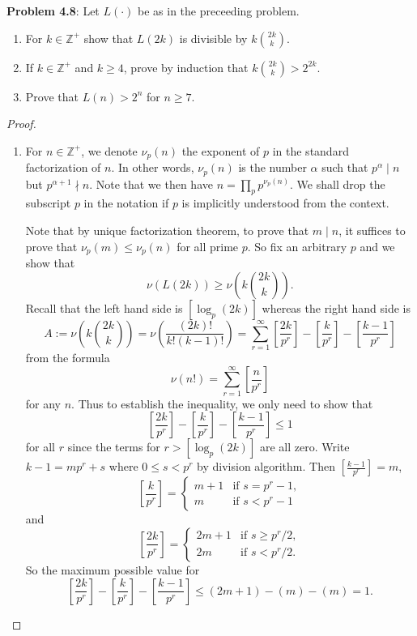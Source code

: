 \documentclass[12pt]{article}
\newcommand{\Z}{\mathbb{Z}}
\newcommand{\IntPart}[1]{\left[ #1 \right]}
\newcommand{\val}[1]{\nu\left( #1 \right)}
\newcommand{\pval}[1]{\nu_p\left( #1 \right)}
\begin{document}
\fi

\textbf{Problem 4.8}: Let $L(\cdot)$ be as in the preceeding problem.
\begin{enumerate}
\item For $k \in \Z^+$ show that $L(2k)$ is divisible by $k \binom{2k}{k}$.
\item If $k \in \Z^+$ and $k \geq 4$, prove by induction that $k \binom{2k}{k} > 2^{2k}$.
\item Prove that $L(n) > 2^n$ for $n \geq 7$.
\end{enumerate}

\begin{proof}
\begin{enumerate}
\item For $n \in \Z^+$, we denote $\pval{n}$ the exponent of $p$ in the standard factorization of $n$. In other words, $\pval{n}$ is the number $\alpha$ such that $p^\alpha \;|\; n$ but $p^{\alpha+1} \nmid n$. Note that we then have $n = \prod_p p^{\pval{n}}$. We shall drop the subscript $p$ in the notation if $p$ is implicitly understood from the context.

Note that by unique factorization theorem, to prove that $m \;|\; n$, it suffices to prove that $\pval{m} \leq \pval{n}$ for all prime $p$. So fix an arbitrary $p$ and we show that
$$\val{L(2k)} \geq \val{k\binom{2k}{k}}.$$
Recall that the left hand side is $[\log_p (2k)]$ whereas the right hand side is
$$A := \val{k\binom{2k}{k}} = \val{\frac{(2k)!}{k!(k-1)!}} = \sum_{r = 1}^{\infty} \IntPart{ \frac{2k}{p^r} } - \IntPart{ \frac{k}{p^r} } - \IntPart{ \frac{k-1}{p^r} }$$
from the formula
$$\val{n!} = \sum_{r = 1}^{\infty} \IntPart{ \frac{n}{p^r} }$$
for any $n$. Thus to establish the inequality, we only need to show that
$$\IntPart{ \frac{2k}{p^r} } - \IntPart{ \frac{k}{p^r} } - \IntPart{ \frac{k-1}{p^r} } \leq 1$$
for all $r$ since the terms for $r > [\log_p(2k)]$ are all zero. Write $k - 1 = m p^r + s$ where $0 \leq s < p^r$ by division algorithm. Then $\IntPart{ \frac{k-1}{p^r} } = m$,
$$\IntPart{ \frac{k}{p^r} } = \begin{cases}
m + 1 &\text{if } s = p^r - 1,\\
m &\text{if } s < p^r - 1
\end{cases}$$
and
$$\IntPart{ \frac{2k}{p^r} } = \begin{cases}
2m + 1 &\text{if } s \geq p^r / 2,\\
2m &\text{if } s < p^r / 2.
\end{cases}$$
So the maximum possible value for
$$\IntPart{ \frac{2k}{p^r} } - \IntPart{ \frac{k}{p^r} } - \IntPart{ \frac{k-1}{p^r} } \leq (2m + 1) - (m) - (m) = 1.$$


\end{enumerate}
\end{proof}
\end{document}
